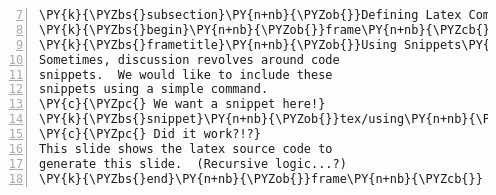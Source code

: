 \begin{Verbatim}[commandchars=\\\{\},numbers=left,numbersep=0.5em,firstnumber=7]
\PY{k}{\PYZbs{}subsection}\PY{n+nb}{\PYZob{}}Defining Latex Commands\PY{n+nb}{\PYZcb{}}
\PY{k}{\PYZbs{}begin}\PY{n+nb}{\PYZob{}}frame\PY{n+nb}{\PYZcb{}}
\PY{k}{\PYZbs{}frametitle}\PY{n+nb}{\PYZob{}}Using Snippets\PY{n+nb}{\PYZcb{}}
Sometimes, discussion revolves around code 
snippets.  We would like to include these 
snippets using a simple command.
\PY{c}{\PYZpc{} We want a snippet here!}
\PY{k}{\PYZbs{}snippet}\PY{n+nb}{\PYZob{}}tex/using\PY{n+nb}{\PYZus{}}snippets\PY{n+nb}{\PYZcb{}}
\PY{c}{\PYZpc{} Did it work?!?}
This slide shows the latex source code to
generate this slide.  (Recursive logic...?)
\PY{k}{\PYZbs{}end}\PY{n+nb}{\PYZob{}}frame\PY{n+nb}{\PYZcb{}}
\end{Verbatim}
